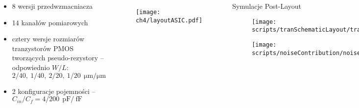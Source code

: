 \begin{frame}{}
    \begin{columns}

    \begin{block}{}
        \begin{itemize}
            \item 8 wersji przedwzmacniacza
            \item 14 kanałów pomiarowych
            \item cztery wersje rozmiarów tranzystorów PMOS tworzących pseudo-rezystory  -- odpowiednio $W/L$: $2/40,\ 1/40,\ 2/20,\ 1/20\ \SI{}{\micro\metre / \micro\metre}$
            \item 2 konfiguracje pojemności -- $C_{in}/C_f = 4/200\ \SI{}{\pico\farad}/\SI{}{\femto\farad}$
        \end{itemize}
        
    \end{block}

\vspace{-2em}
    \begin{figure}[H]
        \centering
        \texttt{[image: ch4/layoutASIC.pdf]} 
    \end{figure}   

    \begin{block}{
Symulacje Post-Layout
    }

    \begin{figure}[H]
        \centering
        \texttt{[image: scripts/tranSchematicLayout/tranSchematicLayout.pdf]}  
    \end{figure}
    \vspace{-5mm} %
    \begin{figure}[H]
        \centering
        \texttt{[image: scripts/noiseContribution/noiseContributionOut.pdf]}  
    \end{figure}
    \end{block}
    \end{columns}   
  
\end{frame}



